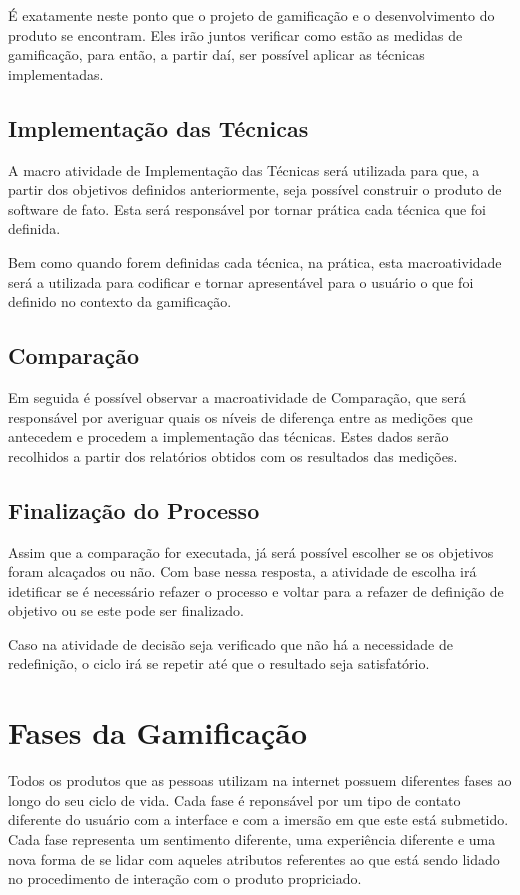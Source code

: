 É exatamente neste ponto que o projeto de gamificação e o desenvolvimento do produto
se encontram. Eles irão juntos verificar como estão as medidas de gamificação, para
então, a partir daí, ser possível aplicar as técnicas implementadas.

\subsection{Implementação das Técnicas}
\label{sub:implematationtechnics}
A macro atividade de Implementação das Técnicas será utilizada para que, a partir
dos objetivos definidos anteriormente, seja possível construir o produto de software
de fato. Esta será responsável por tornar prática
cada técnica que foi definida.

Bem como quando forem definidas cada técnica, na prática, esta macroatividade
será a utilizada para codificar e tornar apresentável para o usuário o que
foi definido no contexto da gamificação.

\subsection{Comparação}
\label{sub:Comparacao}
Em seguida é possível observar a macroatividade de Comparação, que será
responsável por averiguar quais os níveis de diferença entre as medições que
antecedem e procedem a implementação das técnicas. Estes dados serão recolhidos a
partir dos relatórios obtidos com os resultados das medições.

\subsection{Finalização do Processo}
\label{sub:finalprocess}
Assim que a comparação for executada, já será possível escolher se os objetivos
foram alcaçados ou não. Com base nessa resposta, a atividade de escolha irá
idetificar se é necessário refazer o processo e voltar para a refazer de definição
de objetivo ou se este pode ser finalizado.

Caso na atividade de decisão seja verificado que não há a necessidade de
redefinição, o ciclo irá se repetir até que o resultado seja satisfatório.

\section{Fases da Gamificação}
\label{sub:fasesgamification}
Todos os produtos que as pessoas utilizam na internet possuem diferentes
fases ao longo do seu ciclo de vida. Cada fase é reponsável por um tipo de contato diferente 
do usuário com a interface e com a imersão em que este está submetido.
Cada fase representa um sentimento diferente, uma experiência diferente
e uma nova forma de se lidar com aqueles atributos referentes ao que está
sendo lidado no procedimento de interação com o produto propriciado.


